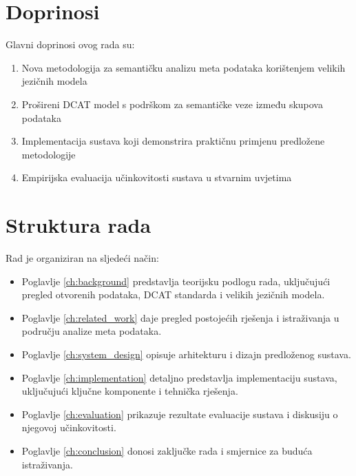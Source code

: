 \section{Doprinosi}
\label{sec:contributions}

Glavni doprinosi ovog rada su:

\begin{enumerate}
    \item Nova metodologija za semantičku analizu meta podataka korištenjem velikih jezičnih modela
    \item Prošireni DCAT model s podrškom za semantičke veze između skupova podataka
    \item Implementacija sustava koji demonstrira praktičnu primjenu predložene metodologije
    \item Empirijska evaluacija učinkovitosti sustava u stvarnim uvjetima
\end{enumerate}

\section{Struktura rada}
\label{sec:structure}

Rad je organiziran na sljedeći način:

\begin{itemize}
    \item Poglavlje \ref{ch:background} predstavlja teorijsku podlogu rada, uključujući 
    pregled otvorenih podataka, DCAT standarda i velikih jezičnih modela.
    
    \item Poglavlje \ref{ch:related_work} daje pregled postojećih rješenja i 
    istraživanja u području analize meta podataka.
    
    \item Poglavlje \ref{ch:system_design} opisuje arhitekturu i dizajn predloženog 
    sustava.
    
    \item Poglavlje \ref{ch:implementation} detaljno predstavlja implementaciju sustava, 
    uključujući ključne komponente i tehnička rješenja.
    
    \item Poglavlje \ref{ch:evaluation} prikazuje rezultate evaluacije sustava i 
    diskusiju o njegovoj učinkovitosti.
    
    \item Poglavlje \ref{ch:conclusion} donosi zaključke rada i smjernice za buduća 
    istraživanja.
\end{itemize}

